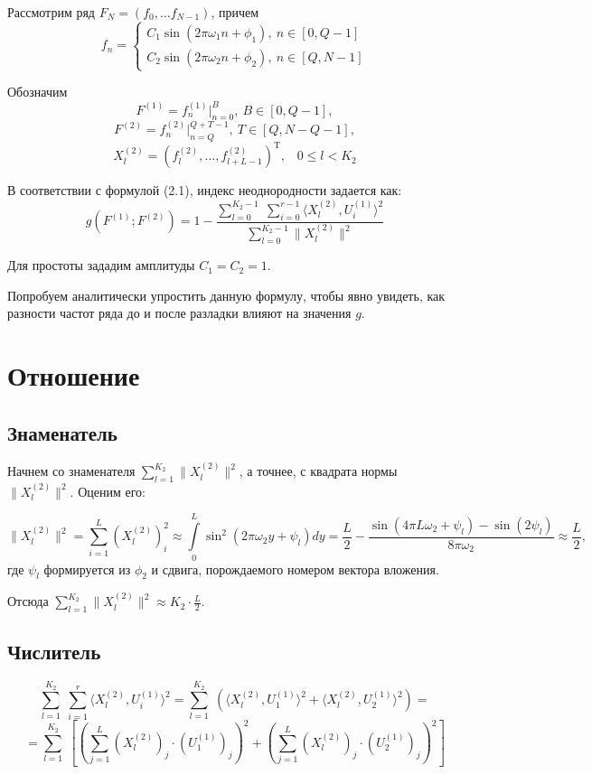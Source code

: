 \documentclass[specialist, substylefile = spbu.rtx,
			   subf, href, 12pt]{disser}
\begin{document}
Рассмотрим ряд $ F_N = (f_0, \dots f_{N-1}) $, причем  
\begin{equation*} 
	f_n = 
	\begin{cases} 
		C_1\sin(2\pi\omega_1 n + \phi_1),\ n \in [0, Q-1] \\ 
		C_2\sin(2\pi\omega_2 n + \phi_2),\ n \in [Q, N-1] 
	\end{cases} 
\end{equation*} 

Обозначим 
$$ F^{(1)} = f_n^{(1)}|_{n=0}^{B},\ B \in [0, Q-1], $$
$$ F^{(2)} = f_n^{(2)}|_{n=Q}^{Q+T-1},\ T \in [Q, N-Q-1], $$
$$X_l^{(2)} = (f_{l}^{(2)}, \dotsc, f_{l+L-1}^{(2)})^\mathrm{T}, \;\;\; 0 \leq l < K_2$$


В соответствии с формулой (2.1), индекс неоднородности задается как:
$$ g(F^{(1)}; F^{(2)}) = 1 - \frac{\sum\limits_{l=0}^{K_2-1}\;\sum\limits_{i=0}^{r-1}\langle X_l^{(2)}, U_i^{(1)}\rangle^2}{\sum\limits_{l=0}^{K_2-1}\|X_l^{(2)}\|^2} $$

Для простоты зададим амплитуды $ C_1 = C_2 = 1 $.

Попробуем аналитически упростить данную формулу, чтобы явно увидеть, как разности частот ряда до и после разладки влияют на значения $ g $.

\section{Отношение}
\subsection{Знаменатель}
Начнем со знаменателя $\sum\limits_{l=1}^{K_2}\|X_l^{(2)}\|^2$, а точнее, с квадрата нормы $\|X_l^{(2)}\|^2$. Оценим его:

$$ \|X_l^{(2)}\|^2 = \sum\limits_{i=1}^{L}(X_{l}^{(2)})_i^2 \approx \int\limits_{0}^{L}\sin^2{(2\pi\omega_2 y + \psi_l)}dy = \frac{L}{2} - \frac{\sin(4\pi L\omega_2 + \psi_l) - \sin(2\psi_l)}{8\pi\omega_2} \approx \frac{L}{2}, $$
где $ \psi_l $ формируется из $ \phi_2 $ и сдвига, порождаемого номером вектора вложения.

Отсюда $\sum\limits_{l=1}^{K_2}\|X_l^{(2)}\|^2 \approx K_2\cdot\frac{L}{2}$.


\subsection{Числитель}
$$ \sum\limits_{l=1}^{K_2}\;\sum\limits_{i=1}^{r}\langle X_l^{(2)}, U_i^{(1)}\rangle^2 = 
\sum\limits_{l=1}^{K_2}\;\left ( \langle X_l^{(2)}, U_1^{(1)}\rangle^2 + \langle X_l^{(2)}, U_2^{(1)}\rangle^2 \right ) = $$
$$ =  \sum\limits_{l=1}^{K_2}\; \left [ \left (\sum\limits_{j=1}^{L}(X_{l}^{(2)})_j\cdot (U_{1}^{(1)})_j\right )^2 + \left ( \sum\limits_{j=1}^{L}(X_{l}^{(2)})_j\cdot (U_{2}^{(1)})_j\right )^2 \right ]$$
\end{document}
